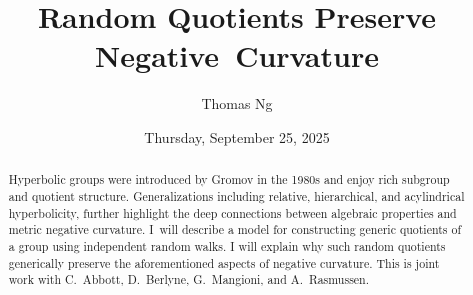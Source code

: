 \documentclass{UAmathtalk}
\author{Thomas Ng}
\title{Random Quotients Preserve Negative~Curvature}
\date{Thursday, September 25, 2025}
\begin{document}
\maketitle

\begin{abstract}
Hyperbolic groups were introduced by Gromov in the 1980s and enjoy rich subgroup and quotient structure.  Generalizations including relative, hierarchical, and acylindrical hyperbolicity, further highlight the deep connections between algebraic properties and metric negative curvature.  I~will describe a model for constructing generic quotients of a group using independent random walks.  I will explain why such random quotients generically preserve the aforementioned aspects of negative curvature.
% 
This is joint work with C.~Abbott, D.~Berlyne, G.~Mangioni, and A.~Rasmussen.
\end{abstract}
\end{document}
